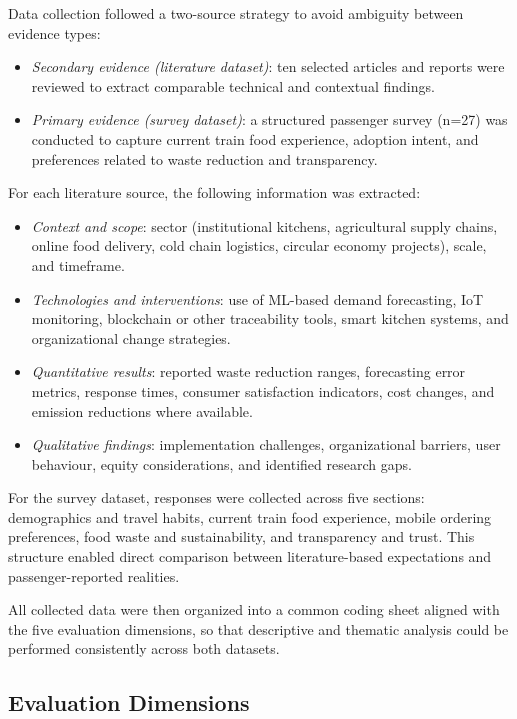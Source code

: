 \documentclass[conference]{IEEEtran}
\begin{document}
Data collection followed a two-source strategy to avoid ambiguity between evidence types:

\begin{itemize}[leftmargin=*]
\item \textit{Secondary evidence (literature dataset)}: ten selected articles and reports were reviewed to extract comparable technical and contextual findings.
\item \textit{Primary evidence (survey dataset)}: a structured passenger survey (n=27) was conducted to capture current train food experience, adoption intent, and preferences related to waste reduction and transparency.
\end{itemize}

For each literature source, the following information was extracted:

\begin{itemize}[leftmargin=*]
\item \textit{Context and scope}: sector (institutional kitchens, agricultural supply chains, online food delivery, cold chain logistics, circular economy projects), scale, and timeframe.
\item \textit{Technologies and interventions}: use of ML-based demand forecasting, IoT monitoring, blockchain or other traceability tools, smart kitchen systems, and organizational change strategies.
\item \textit{Quantitative results}: reported waste reduction ranges, forecasting error metrics, response times, consumer satisfaction indicators, cost changes, and emission reductions where available.
\item \textit{Qualitative findings}: implementation challenges, organizational barriers, user behaviour, equity considerations, and identified research gaps.
\end{itemize}

For the survey dataset, responses were collected across five sections: demographics and travel habits, current train food experience, mobile ordering preferences, food waste and sustainability, and transparency and trust. This structure enabled direct comparison between literature-based expectations and passenger-reported realities.

All collected data were then organized into a common coding sheet aligned with the five evaluation dimensions, so that descriptive and thematic analysis could be performed consistently across both datasets.

\subsection{Evaluation Dimensions}
\end{document}
